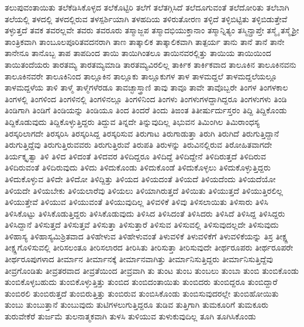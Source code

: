 {ತಲುಪುವಂತಾಯಿತು
ತಲೆಕೆಡಿಸಿಕೊಳ್ಳದ
ತಲೆಕೊಟ್ಟಿರಿ
ತಲೆಗೆ
ತಲೆತಗ್ಗಿಸಿದೆ
ತಲೆದೂಗುವಂತೆ
ತಲೆದೋರಿತು
ತಲೆಬಾಗಿ
ತಲೆಯಲ್ಲಿ
ತಳದಲ್ಲಿ
ತಳದಲ್ಲಿರುವ
ತಳಸ್ಪರ್ಶಿಯಾಗಿ
ತಳಹದಿಯ
ತಳಿರುತೋರಣ
ತಳ್ಳಿದೆ
ತಳ್ಳಿಬಿಟ್ಟಿತು
ತಳ್ಳಿಬಿಡುತ್ತೇವೆ
ತಳ್ಳುತ್ತದೆ
ತವಕ
ತವರಲ್ಲವೇ
ತವರು
ತವರೂರು
ತಸ್ಮಾಜ್ಜಪ
ತಸ್ಮಾದಭಿಯುಕ್ತಾನಾಂ
ತಸ್ಮಾನ್ನಿತ್ಯಂ
ತಸ್ಮಿನ್ಪ್ರಾಪ್ತೇ
ತಸ್ಮೈ
ತಸ್ಮೈಶ್ರೀ
ತಾಂತ್ರಿಕವಾಗಿ
ತಾಂಬೂಲಪೂರಿತವದನರಾಗಿ
ತಾಣ
ತಾತ್ಕಾಲಿಕ
ತಾತ್ಕಾಲಿಕವಾಗಿ
ತಾತ್ಪರ್ಯ
ತಾನು
ತಾನೆ
ತಾನೆ
ತಾನೇ
ತಾನೇನೂ
ತಾನೊಬ್ಬ
ತಾಪ
ತಾಪದಿಂದ
ತಾಯಿ
ತಾಯಿಗಿಂತಲೂ
ತಾಯಿನವರಲ್ಲಿತ್ತು
ತಾಯಿಯ
ತಾಯಿಯಿಂದ
ತಾಯಿತಂದೆಯರು
ತಾರತಮ್ಯ
ತಾರತಮ್ಯಮಾಡಿ
ತಾರತಮ್ಯವಿರಲಿಲ್ಲ
ತಾರ್ಕಿಕ
ತಾರ್ಕಿಕವಾದ
ತಾಲೂಕಿನ
ತಾಲೂಕಿನವನು
ತಾಲೂಕಿನವರೇ
ತಾಲೂಕಿನಿಂದ
ತಾಲ್ಲೂಕಿನ
ತಾಲ್ಲೂಕು
ತಾಲ್ಲೂಕುಗಳ
ತಾಳ
ತಾಳಮದ್ದಲೆ
ತಾಳಮದ್ದಲೆಯಲ್ಲೂ
ತಾಳಮದ್ದಳೆಯ
ತಾಳಿ
ತಾಳ್ಮೆ
ತಾಳ್ಮೆಗಳೆರಡೂ
ತಾವಚ್ಛಾಸ್ತ್ರಾಣಿ
ತಾವು
ತಾವೂ
ತಾವೇ
ತಾವೊಬ್ಬರೇ
ತಿಂಗಳ
ತಿಂಗಳಕಾಲ
ತಿಂಗಳಲ್ಲಿ
ತಿಂಗಳಿಂದ
ತಿಂಗಳಿನಲ್ಲಿ
ತಿಂಗಳಿನಲ್ಲೂ
ತಿಂಗಳಿನಿಂದ
ತಿಂಗಳು
ತಿಂಗಳುಗಳದ್ದಾಗಿದ್ದರೂ
ತಿಂಗಳುಗಳು
ತಿಂಡಿ
ತಿಂಡಿಗಾಗಿ
ತಿಂಡಿಗೆ
ತಿಂಡಿಯನ್ನು
ತಿಂಡಿಯೂ
ತಿಂದ
ತಿಂದರೆ
ತಿಂದು
ತಿಙಂತ
ತಿತೀರ್ಷುರ್ದುಸ್ತರಂ
ತಿದ್ದಿ
ತಿದ್ದಿಕೊಂಡು
ತಿದ್ದಿಕೊಡುವುದು
ತಿದ್ದಿಕೊಳ್ಳುತ್ತಿದ್ದರು
ತಿದ್ದುವ
ತಿನ್ನದೇ
ತಿನ್ನುವುದಿಲ್ಲ
ತಿಭುವನ
ತಿಮಿಂಗಿಲ
ತಿಮಿರಾಂಧಸ್ಯ
ತಿರಸ್ಕರಿಲಾಗದೇ
ತಿರಸ್ಕರಿಸಿ
ತಿರಸ್ಕರಿಸಿದ್ದ
ತಿರಸ್ಕರಿಸುವ
ತಿರುಗಾಟ
ತಿರುಗಾಡುತ್ತಾ
ತಿರುಗಿ
ತಿರುಗಿದೆ
ತಿರುಗುತ್ತಿದ್ದಾನೆ
ತಿರುಗುತ್ತಿದ್ದೆವು
ತಿರುಗುತ್ತಿರುವವರು
ತಿರುಗುತ್ತಿರುವೆ
ತಿರುಪತಿ
ತಿರುಳನ್ನು
ತಿರುವಿನಲ್ಲಿರುವ
ತಿರೋಹಿತವಾಗದೇ
ತಿರ್ಯಕ್ಕೃತ್ವಾ
ತಿಳಿ
ತಿಳಿದ
ತಿಳಿದಂತೆ
ತಿಳಿದವರ
ತಿಳಿದಿದ್ದರೂ
ತಿಳಿದಿದ್ದೆ
ತಿಳಿದಿದ್ದೇನೆ
ತಿಳಿದಿರುತ್ತದೆ
ತಿಳಿದಿರುವ
ತಿಳಿದಿರುವಂತೆ
ತಿಳಿದಿರುವುದು
ತಿಳಿದು
ತಿಳಿದುಕೊಂಡು
ತಿಳಿದುಕೊಂಡೆ
ತಿಳಿದುಕೊಳ್ಳಲು
ತಿಳಿದುಕೊಳ್ಳುತ್ತಿದ್ದರು
ತಿಳಿದುಕೊಳ್ಳುವ
ತಿಳಿದೇ
ತಿಳಿದೋ
ತಿಳಿದ್ದಿತ್ತು
ತಿಳಿಯದ
ತಿಳಿಯದಂತೆ
ತಿಳಿಯದೆ
ತಿಳಿಯದೆಂದು
ತಿಳಿಯದೆಯೋ
ತಿಳಿಯದೇ
ತಿಳಿಯಬೇಕು
ತಿಳಿಯಲಾರೆವು
ತಿಳಿಯಲು
ತಿಳಿಯಾಗಿರುತ್ತದೆ
ತಿಳಿಯಿತು
ತಿಳಿಯುತ್ತದೆ
ತಿಳಿಯುತ್ತಿರಲಿಲ್ಲ
ತಿಳಿಯುತ್ತೇವೆ
ತಿಳಿಯುವ
ತಿಳಿಯುವಂತೆ
ತಿಳಿಯುವುದಿಲ್ಲ
ತಿಳಿವಳಿಕೆ
ತಿಳಿವು
ತಿಳಿಸಲಾಯಿತು
ತಿಳಿಸಾರು
ತಿಳಿಸಿ
ತಿಳಿಸಿಕೊಟ್ಟು
ತಿಳಿಸಿಕೊಡುತ್ತಿದ್ದರು
ತಿಳಿಸಿಕೊಡುವುದು
ತಿಳಿಸಿದ
ತಿಳಿಸಿದಂತೆ
ತಿಳಿಸಿದರು
ತಿಳಿಸಿದೆ
ತಿಳಿಸಿದ್ದ
ತಿಳಿಸಿದ್ದರು
ತಿಳಿಸಿದ್ದಾನೆ
ತಿಳಿಸುತ್ತದೆ
ತಿಳಿಸುತ್ತವೆ
ತಿಳಿಸುತ್ತಾ
ತಿಳಿಸುತ್ತಾರೆ
ತಿಳಿಸುವ
ತಿಳಿಸುವಲ್ಲಿ
ತಿಳಿಸುವುದಲ್ಲದೇ
ತಿಳಿಸುವುದು
ತಿಳಿಹಾಸ್ಯ
ತಿಳಿಹಾಸ್ಯಮಿಶ್ರಿತವಾದ
ತಿಳಿಹೇಳುವ
ತಿಳಿಹೇಳುವಂತೆ
ತಿಳುವಳಿಕೆ
ತಿಳುವಳಿಕೆಗೆ
ತಿಳುವಳಿಕೆಯನ್ನು
ತಿಸ್ರ
ತೀಕ್ಷ್ಣ
ತೀಕ್ಷ್ಣಗೊಳಿಸುವಲ್ಲಿ
ತೀರಿಸಲಂತೂ
ತೀರಿಸಲಾರದ
ತೀರಿಸಿತು
ತೀರಿಸುತ್ತಾ
ತೀರಿಸುವುದೇ
ತೀರ್ಥರೂಪರು
ತೀರ್ಥರೂಪರೇ
ತೀರ್ಥರೂಪುಗಳಾದ
ತೀರ್ಮಾನ
ತೀರ್ಮಾನಕ್ಕೆ
ತೀರ್ಮಾನವಾಗಿತ್ತು
ತೀರ್ಮಾನಿಸುತ್ತಿದ್ದರು
ತೀರ್ಮಾನಿಸುತ್ತಿದ್ದೆವು
ತೀವ್ರಗೊಂಡಿತು
ತೀವ್ರತರವಾದ
ತೀವ್ರತೆಯಿಂದ
ತೀವ್ರವಾಗಿ
ತು
ತುಂಟ
ತುಂಬ
ತುಂಬಲು
ತುಂಬಾ
ತುಂಬಿ
ತುಂಬಿಕೊಂಡು
ತುಂಬಿಕೊಳ್ಳಬಹುದು
ತುಂಬಿಕೊಳ್ಳುತ್ತಿತ್ತು
ತುಂಬಿದ
ತುಂಬಿದಂತಾಯಿತು
ತುಂಬಿದರು
ತುಂಬಿದ್ದರೂ
ತುಂಬಿದ್ದಾರೆ
ತುಂಬಿರಲಿ
ತುಂಬಿರುತ್ತದೆ
ತುಂಬಿರುತ್ತಿತ್ತು
ತುಂಬಿರುವ
ತುಂಬಿಸಿಕೊಂಡು
ತುಂಬಿಸುವುದರಲ್ಲೇ
ತುಂಬಿಹೋಯಿತು
ತುಂಬು
ತುಂಬುತ್ತಾನೆ
ತುಂಬುವುದು
ತುಟಿಗಳಲುಗುತ್ತಿದ್ದರೂ
ತುಡಿವ
ತುತ್ತಿಗಾಗಿ
ತುಮಕೂರಿಗೆ
ತುಮಕೂರು
ತುರುವೇಕೆರೆ
ತುರ್ಜಮೆ
ತುಲನಾತ್ಮಕವಾಗಿ
ತುಳಸಿ
ತುಳಿಯುವ
ತುಳುಕುವುದಿಲ್ಲ
ತೂಗಿ
ತೂಗಿಸಿಕೊಂಡು
}
